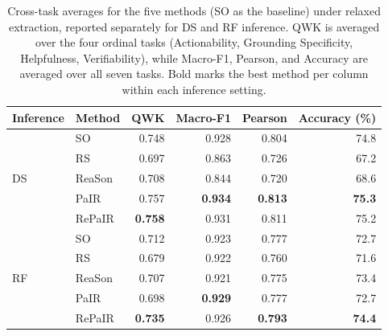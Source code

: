 \begin{table}[t]
\centering
\normalsize
\setlength{\tabcolsep}{5pt}
\begin{tabular}{llrrrr}
\toprule
Inference & Method & QWK & Macro-F1 & Pearson & Accuracy (\%) \\
\midrule
\multirow{5}{*}{DS}
& SO     & 0.748 & 0.928 & 0.804 & 74.8 \\
& RS     & 0.697 & 0.863 & 0.726 & 67.2 \\
& ReaSon & 0.708 & 0.844 & 0.720 & 68.6 \\
& PaIR   & 0.757 & \textbf{0.934} & \textbf{0.813} & \textbf{75.3} \\
& RePaIR & \textbf{0.758} & 0.931 & 0.811 & 75.2 \\
\midrule
\multirow{5}{*}{RF}
& SO     & 0.712 & 0.923 & 0.777 & 72.7 \\
& RS     & 0.679 & 0.922 & 0.760 & 71.6 \\
& ReaSon & 0.707 & 0.921 & 0.775 & 73.4 \\
& PaIR   & 0.698 & \textbf{0.929} & 0.777 & 72.7 \\
& RePaIR & \textbf{0.735} & 0.926 & \textbf{0.793} & \textbf{74.4} \\
\bottomrule
\end{tabular}
\caption{Cross-task averages for the five methods (SO as the baseline) under relaxed extraction, reported separately for DS and RF inference. QWK is averaged over the four ordinal tasks (Actionability, Grounding Specificity, Helpfulness, Verifiability), while Macro-F1, Pearson, and Accuracy are averaged over all seven tasks. Bold marks the best method per column within each inference setting.}
\label{tab:full-method-averages}
\end{table}

